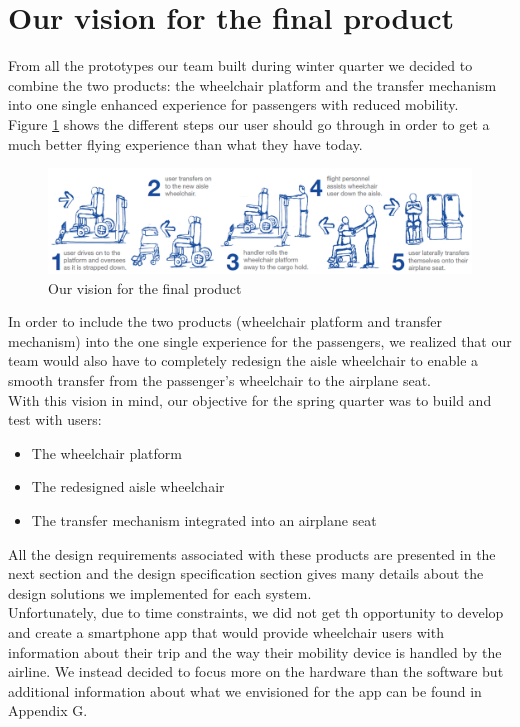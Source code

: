 \section{Our vision for the final product}

From all the prototypes our team built during winter quarter we decided to combine the two products: the wheelchair platform and the transfer mechanism into one single enhanced experience for passengers with reduced mobility. \\

Figure \ref{fig:our_vision} shows the different steps our user should go through in order to get a much better flying experience than what they have today. \\


\begin{figure}[h]
  \centering
     \includegraphics[width=16cm]{images/our_vision.png}
   \caption{Our vision for the final product}
  \label{fig:our_vision}
\end{figure}

In order to include the two products (wheelchair platform and transfer mechanism) into the one single experience for the passengers, we realized that our team would also have to completely redesign the aisle wheelchair to enable a smooth transfer from the passenger’s wheelchair to the airplane seat.\\


With this vision in mind, our objective for the spring quarter was to build and test with users:
\begin{itemize}
\item The wheelchair platform
\item The redesigned aisle wheelchair
\item The transfer mechanism integrated into an airplane seat
\end{itemize}

All the design requirements associated with these products are presented in the next section and the design specification section gives many details about the design solutions we implemented for each system.\\

Unfortunately, due to time constraints, we did not get th opportunity to develop and create a smartphone app that would provide wheelchair users with information about their trip and the way their mobility device is handled by the airline. We instead decided to focus more on the hardware than the software but additional information about what we envisioned for the app can be found in Appendix G.

